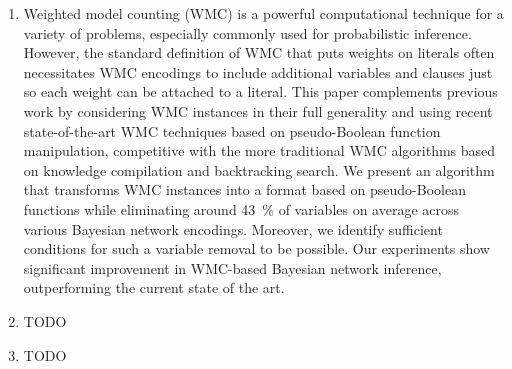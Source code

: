 \begin{enumerate}
\item Weighted model counting (WMC) is a powerful computational technique for a variety of problems, especially commonly used for probabilistic inference. However, the standard definition of WMC that puts weights on literals often necessitates WMC encodings to include additional variables and clauses just so each weight can be attached to a literal. This paper complements previous work by considering WMC instances in their full generality and using recent state-of-the-art WMC techniques based on pseudo-Boolean function manipulation, competitive with the more traditional WMC algorithms based on knowledge compilation and backtracking search. We present an algorithm that transforms WMC instances into a format based on pseudo-Boolean functions while eliminating around \SI{43}{\percent} of variables on average across various Bayesian network encodings. Moreover, we identify sufficient conditions for such a variable removal to be possible. Our experiments show significant improvement in WMC-based Bayesian network inference, outperforming the current state of the art.
\item TODO
\item TODO
\end{enumerate}

